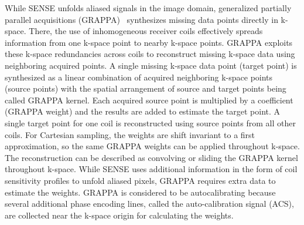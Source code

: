 \documentclass[english,version-2022-01]{uzl-thesis} %
\begin{document}
While SENSE unfolds aliased signals in the image domain, generalized partially parallel acquisitions (GRAPPA)~\cite{GRAPPA} synthesizes missing data points directly in k-space. 
There, the use of inhomogeneous receiver coils effectively spreads information from one k-space point to nearby k-space points. GRAPPA exploits these k-space redundancies across coils to reconstruct missing k-space data using neighboring acquired points. A single missing k-space data point (target point) is synthesized as a linear combination of acquired neighboring k-space points (source points) with the spatial arrangement of source and target points being called GRAPPA kernel. Each acquired source point is multiplied by a coefficient (GRAPPA weight) and the results are added to estimate the target point. A single target point for one coil is reconstructed using source points from all other coils. For Cartesian sampling, the weights are shift invariant to a first approximation, so the same GRAPPA weights can be applied throughout k-space. The reconstruction can be described as convolving or sliding the GRAPPA kernel throughout k-space.
While SENSE uses additional information in the form of coil sensitivity profiles to unfold aliased pixels, GRAPPA requires extra data to estimate the weights. GRAPPA is considered to be autocalibrating because several additional phase encoding lines, called the auto-calibration signal (ACS), are collected near the k-space origin for calculating the weights. 
\end{document}
